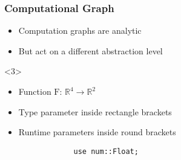 \documentclass[11pt]{beamer}
\begin{document}
\begin{frame}[fragile]
	\frametitle{Computational Graph}

	\begin{itemize}
		\item Computation graphs are analytic 
		\item But act on a different abstraction level
	\end{itemize}

	\begin{figure}
		
	\end{figure}


	\begin{onlyenv}
		\begin{minipage}{.45\linewidth}
			\begin{itemize}
				\item Function \( \text{F: }\mathbb{R}^4 \to \mathbb{R}^2 \)
				\item Type parameter inside rectangle brackets
				\item Runtime parameters inside round brackets
			\end{itemize}
		\end{minipage}
		\hfill
		\begin{minipage}{.50\linewidth}
			\tiny
			\begin{verbatim}
				use num::Float;


\end{verbatim}
\end{minipage}
\end{onlyenv}
\end{frame}
\end{document}
